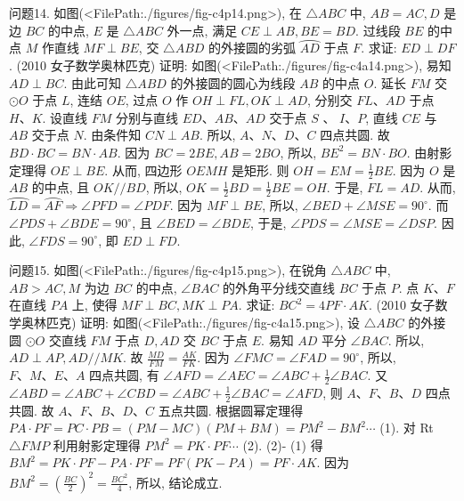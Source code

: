 问题14. 如图(<FilePath:./figures/fig-c4p14.png>), 在 $\triangle A B C$ 中, $A B=A C, D$ 是边 $B C$ 的中点, $E$ 是 $\triangle A B C$ 外一点, 满足 $C E \perp A B, B E=B D$. 过线段 $B E$ 的中点 $M$ 作直线 $M F \perp B E$, 交 $\triangle A B D$ 的外接圆的劣弧 $\overparen{A D}$ 于点 $F$. 求证: $E D \perp D F$. (2010 女子数学奥林匹克)
证明: 如图(<FilePath:./figures/fig-c4a14.png>), 易知 $A D \perp B C$. 由此可知 $\triangle A B D$ 的外接圆的圆心为线段 $A B$ 的中点 $O$. 延长 $F M$ 交 $\odot O$ 于点 $L$, 连结 $O E$, 过点 $O$ 作 $O H \perp F L, O K \perp A D$, 分别交 $F L 、 A D$ 于点 $H 、 K$. 设直线 $F M$ 分别与直线 $E D 、 A B 、 A D$ 交于点 $S$ 、 $I 、 P$, 直线 $C E$ 与 $A B$ 交于点 $N$. 由条件知 $C N \perp A B$. 所以, $A 、 N 、 D 、 C$ 四点共圆.
故 $B D \cdot B C=B N \cdot A B$. 因为 $B C=2 B E, A B= 2 B O$, 所以, $B E^2=B N \cdot B O$. 由射影定理得 $O E \perp B E$. 从而, 四边形 $O E M H$ 是矩形.
则 $O H=E M=\frac{1}{2} B E$. 因为 $O$ 是 $A B$ 的中点, 且 $O K / / B D$, 所以, $O K=\frac{1}{2} B D= \frac{1}{2} B E=O H$. 于是, $F L=A D$. 从而, $\overparen{L D}=\overparen{A F} \Rightarrow \angle P F D=\angle P D F$. 因为 $M F \perp B E$, 所以, $\angle B E D+\angle M S E=90^{\circ}$. 而 $\angle P D S+\angle B D E=90^{\circ}$, 且 $\angle B E D=\angle B D E$, 于是, $\angle P D S=\angle M S E=\angle D S P$. 因此, $\angle F D S=90^{\circ}$, 即 $E D \perp F D$.



问题15. 如图(<FilePath:./figures/fig-c4p15.png>), 在锐角 $\triangle A B C$ 中, $A B>A C, M$ 为边 $B C$ 的中点, $\angle B A C$ 的外角平分线交直线 $B C$ 于点 $P$. 点 $K 、 F$ 在直线 $P A$ 上, 使得 $M F \perp B C, M K \perp P A$. 求证: $B C^2=4 P F \cdot A K$. (2010 女子数学奥林匹克)
证明: 如图(<FilePath:./figures/fig-c4a15.png>), 设 $\triangle A B C$ 的外接圆 $\odot O$ 交直线 $F M$ 于点 $D, A D$ 交 $B C$ 于点 $E$. 易知 $A D$ 平分 $\angle B A C$. 所以, $A D \perp A P, A D / / M K$. 故 $\frac{M D}{F M}=\frac{A K}{F K}$. 因为 $\angle F M C=\angle F A D=90^{\circ}$, 所以, $F 、 M 、 E 、 A$ 四点共圆, 有 $\angle A F D= \angle A E C=\angle A B C+\frac{1}{2} \angle B A C$. 又 $\angle A B D=\angle A B C+\angle C B D=\angle A B C+\frac{1}{2} \angle B A C=\angle A F D$, 则 $A 、 F 、 B 、 D$ 四点共圆.
故 $A 、 F 、 B 、 D 、 C$ 五点共圆.
根据圆幂定理得 $P A \cdot P F=P C \cdot P B=(P M-M C)(P M+B M)=P M^2-B M^2 \cdots$ (1). 对 Rt $\triangle F M P$ 利用射影定理得 $P M^2=P K \cdot P F \cdots$ (2). (2)- (1) 得 $B M^2= P K \cdot P F-P A \cdot P F=P F(P K-P A)=P F \cdot A K$. 因为 $B M^2=\left(\frac{B C}{2}\right)^2= \frac{B C^2}{4}$, 所以, 结论成立.



